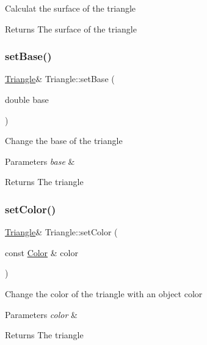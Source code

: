 Calculat the surface of the triangle \begin{DoxyReturn}{Returns}
The surface of the triangle 
\end{DoxyReturn}
\mbox{\label{classTriangle_a383d64ede7a2ca52e7f166ca03887041}} 
\subsubsection{\texorpdfstring{set\+Base()}{setBase()}}
{\footnotesize\ttfamily \hyperlink{classTriangle}{Triangle}\& Triangle\+::set\+Base (\begin{DoxyParamCaption}\item[{double}]{base }\end{DoxyParamCaption})}

Change the base of the triangle 
\begin{DoxyParams}{Parameters}
{\em base} & \\
\hline
\end{DoxyParams}
\begin{DoxyReturn}{Returns}
The triangle 
\end{DoxyReturn}
\mbox{\label{classTriangle_a52368ea66c07dcbb43372d36c832dc35}} 
\subsubsection{\texorpdfstring{set\+Color()}{setColor()}\hspace{0.1cm}{\footnotesize\ttfamily [1/2]}}
{\footnotesize\ttfamily \hyperlink{classTriangle}{Triangle}\& Triangle\+::set\+Color (\begin{DoxyParamCaption}\item[{const \hyperlink{classColor}{Color} \&}]{color }\end{DoxyParamCaption})}

Change the color of the triangle with an object color 
\begin{DoxyParams}{Parameters}
{\em color} & \\
\hline
\end{DoxyParams}
\begin{DoxyReturn}{Returns}
The triangle 
\end{DoxyReturn}
\mbox{\label{classTriangle_a9d8a052b74403f501584efd4ebdee153}} 
